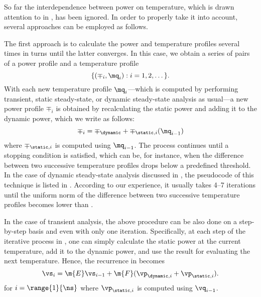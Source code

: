 So far the interdependence between power on temperature, which is drawn
attention to in , has been ignored. In order to properly take
it into account, several approaches can be employed as follows.

The first approach is to calculate the power and temperature profiles several
times in turns until the latter converges. In this case, we obtain a series of
pairs of a power profile and a temperature profile
\[
  \{ (\mp_i, \mq_i): i = 1, 2, \dots \}.
\]
With each new temperature profile $\mq_i$---which is computed by performing
transient, static steady-state, or dynamic steady-state analysis as usual---a
new power profile $\mp_i$ is obtained by recalculating the static power and
adding it to the dynamic power, which we write as follows:
\[
  \mp_i = \mp_\dynamic + \mp_{\static, i}(\mq_{i - 1})
\]
where $\mp_{\static, i}$ is computed using $\mq_{i - 1}$. The process continues
until a stopping condition is satisfied, which can be, for instance, when the
difference between two successive temperature profiles drops below a predefined
threshold. In the case of dynamic steady-state analysis discussed in
, the pseudocode of this technique is listed
in . According to our experience, it
usually takes 4--7 iterations until the uniform norm of the difference between
two successive temperature profiles becomes lower than .

In the case of transient analysis, the above procedure can be also done on a
step-by-step basis and even with only one iteration. Specifically, at each step
of the iterative process in , one can simply
calculate the static power at the current temperature, add it to the dynamic
power, and use the result for evaluating the next temperature. Hence, the
recurrence in  becomes
\[
  \vs_i = \m{E} \vs_{i - 1} + \m{F} (\vp_{\dynamic, i} + \vp_{\static, i}).
\]
for $i = \range{1}{\ns}$ where $\vp_{\static, i}$ is computed using $\vq_{i -
1}$.

